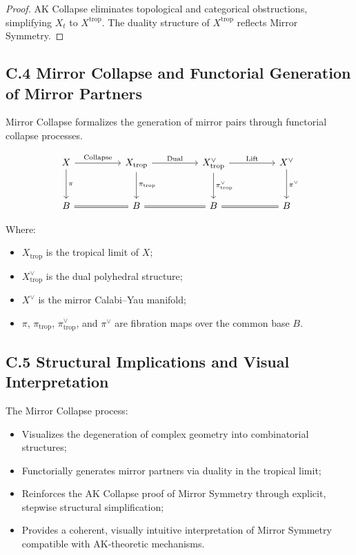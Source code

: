 \documentclass[11pt]{article}
\begin{document}
\begin{proof}
AK Collapse eliminates topological and categorical obstructions, simplifying $X_t$ to $X^{\mathrm{trop}}$. The duality structure of $X^{\mathrm{trop}}$ reflects Mirror Symmetry.
\end{proof}

\subsection*{C.4 Mirror Collapse and Functorial Generation of Mirror Partners}

Mirror Collapse formalizes the generation of mirror pairs through functorial collapse processes.

\[
\begin{tikzcd}[column sep=huge, row sep=large]
X \arrow[r, "\mathrm{Collapse}"] \arrow[d, "\pi"]
& X_{\mathrm{trop}} \arrow[d, "\pi_{\mathrm{trop}}"] \arrow[r, "\mathrm{Dual}"]
& X_{\mathrm{trop}}^\vee \arrow[d, "\pi_{\mathrm{trop}}^\vee"] \arrow[r, "\mathrm{Lift}"]
& X^\vee \arrow[d, "\pi^\vee"] \\
B \arrow[r, equals]
& B \arrow[r, equals]
& B \arrow[r, equals]
& B
\end{tikzcd}
\]

Where:

\begin{itemize}
    \item $X_{\mathrm{trop}}$ is the tropical limit of $X$;
    \item $X_{\mathrm{trop}}^\vee$ is the dual polyhedral structure;
    \item $X^\vee$ is the mirror Calabi--Yau manifold;
    \item $\pi$, $\pi_{\mathrm{trop}}$, $\pi_{\mathrm{trop}}^\vee$, and $\pi^\vee$ are fibration maps over the common base $B$.
\end{itemize}

\subsection*{C.5 Structural Implications and Visual Interpretation}

The Mirror Collapse process:

\begin{itemize}
    \item Visualizes the degeneration of complex geometry into combinatorial structures;
    \item Functorially generates mirror partners via duality in the tropical limit;
    \item Reinforces the AK Collapse proof of Mirror Symmetry through explicit, stepwise structural simplification;
    \item Provides a coherent, visually intuitive interpretation of Mirror Symmetry compatible with AK-theoretic mechanisms.
\end{itemize}
\end{document}
